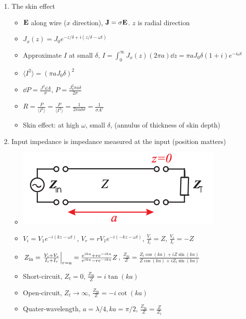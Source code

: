 \documentclass{article}
\theoremstyle{remark}
\begin{document}
\begin{enumerate}
\begin{itemize}
    \end{itemize}
    \item The skin effect \begin{itemize}
        \item $\vb{E}$ along wire ($x$ direction), $\vb{J}=\sigma\vb{E}$. $z$ is radial direction
        \item $J_x(z)=J_0e^{-z/\delta+i(z/\delta-\omega t)}$
        \item Approximate $I$ at small $\delta$, $I=\int_0^\infty J_x(z)(2\pi a)\dd z=\pi aJ_0\delta(1+i)e^{-i\omega t}$
        \item $\langle I^2\rangle=(\pi aJ_0\delta)^2$
        \item $\dd P=\frac{J^2\dd A}{\sigma}$, $P=\frac{J_0^2\pi a\delta}{2\sigma}$
        \item $R=\frac{P}{\langle I^2\rangle} = \frac{P}{\langle I^2\rangle}=\frac{1}{2\pi a\delta\sigma}=\frac{1}{\sigma A'}$
        \item Skin effect: at high $\omega$, small $\delta$,  (annulus of thickness of skin depth)
    \end{itemize}
    \item Input impedance is impedance measured at the input (position matters)\begin{itemize}
            \item \includegraphics[width=0.5\linewidth]{input impedance.png}
            \item $V_i=V_1e^{-i(kz-\omega t)}$, $V_r=rV_1e^{-i(-kz-\omega t)}$, $\frac{V_i}{I_i}=Z$, $\frac{V_r}{I_r}=-Z$
            \item $Z_{\text{in}}=\eval{\frac{V_i+V_r}{I_i+I_r}}_{r=a}=\frac{e^{ika}+re^{-ika}}{e^{ika}-re^{-ika}}Z$, $\frac{Z_{\text{in}}}{Z}=\frac{Z_t\cos(ka)+iZ\sin(ka)}{Z\cos(ka)+iZ_t\sin(ka)}$
            \item Short-circuit, $Z_t = 0$, $\frac{Z_{\text{in}}}{Z}=i\tan(ka)$
            \item Open-circuit, $Z_t\rightarrow\infty$, $\frac{Z_{\text{in}}}{Z}=-i\cot(ka)$
            \item Quater-wavelength, $a=\lambda/4, ka=\pi/2$, $\frac{Z_{\text{in}}}{Z}=\frac{Z}{Z_t}$
        \end{itemize}

\end{enumerate}
\end{document}

